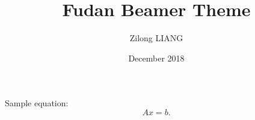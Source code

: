 \documentclass{beamer}
\title{Fudan Beamer Theme}
\author{Zilong LIANG}
\date{December 2018}
\begin{document}
  
  \begin{frame}
    \maketitle
  \end{frame}

  \begin{frame}
    Sample equation:
    $$ Ax = b. $$
  \end{frame}
\end{document}
